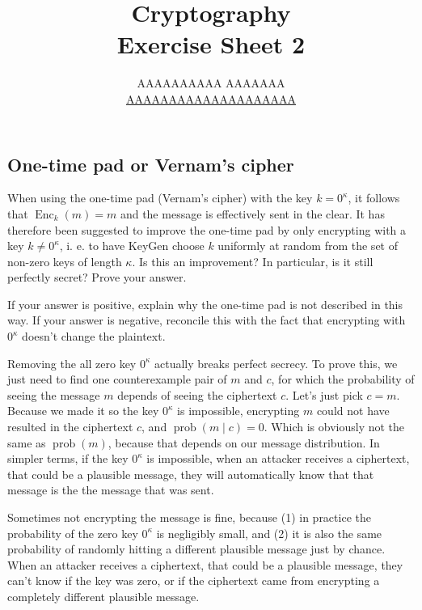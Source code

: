 \documentclass{article}
\title{Cryptography \\ Exercise Sheet 2}
\author{
  AAAAAAAAAA AAAAAAA \\
  \href{mailto:AAAAAAAAAAAAAAAAAAAA}{AAAAAAAAAAAAAAAAAAAA}
}
\begin{document}
  \maketitle

  \setcounter{section}{2}
  \subsection{One-time pad or Vernam's cipher}
  \begin{centerframebox}
    When using the one-time pad (Vernam's cipher) with the key $k = 0^\kappa$, it
    follows that $\operatorname{Enc}_k(m) = m$ and the message is effectively sent in the clear.
    It has therefore been suggested to improve the one-time pad by only encrypting with a key $k \neq 0^\kappa$,
    i. e. to have KeyGen choose $k$ uniformly at random from the set of non-zero keys of length $\kappa$.
    Is this an improvement? In particular, is it still perfectly secret? Prove your answer.

    If your answer is positive, explain why the one-time pad is not described
    in this way. If your answer is negative, reconcile this with the fact that
    encrypting with $0^\kappa$ doesn't change the plaintext.
  \end{centerframebox}
  Removing the all zero key $0^\kappa$ actually breaks perfect secrecy.
  To prove this, we just need to find one counterexample pair of $m$ and $c$,
  for which the probability of seeing the message $m$ depends of seeing the ciphertext $c$.
  Let's just pick $c = m$.
  Because we made it so the key $0^\kappa$ is impossible,
  encrypting $m$ could not have resulted in the ciphertext $c$, and $\operatorname{prob}(m \mid c) = 0$.
  Which is obviously not the same as $\operatorname{prob}(m)$, because that depends on our message distribution.
  In simpler terms, if the key $0^\kappa$ is impossible, when an attacker receives a ciphertext, that could be a plausible message,
  they will automatically know that that message is the the message that was sent.

  Sometimes not encrypting the message is fine, because
  (1) in practice the probability of the zero key $0^\kappa$ is negligibly small, and
  (2) it is also the same probability of randomly hitting a different plausible message just by chance.
  When an attacker receives a ciphertext, that could be a plausible message, they can't know if the key was zero,
  or if the ciphertext came from encrypting a completely different plausible message.
\end{document}
